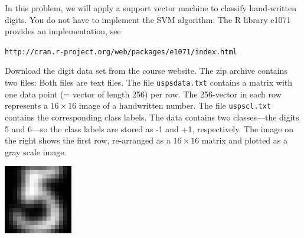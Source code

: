\documentclass[]{../util/ColumbiaAssm}
\begin{document}
\begin{questions}
%
%

In this problem, we will apply a support vector machine to classify hand-written digits. You do not have to implement the SVM algorithm: 
The R library e1071 provides an implementation, see

{\tt http://cran.r-project.org/web/packages/e1071/index.html}

\begin{minipage}{0.7\textwidth}
Download the digit data set from the course website. The zip archive contains two files: Both files are text files. The file
{\tt uspsdata.txt} contains a matrix with one data point (= vector of length 256) per row. 
The 256-vector in each row represents a $16\times 16$ 
image of a handwritten number. The file {\tt uspscl.txt} contains the corresponding class labels. 
The data contains two classes---the digits 5 and 6---so the class labels are stored as -1 and +1, respectively.
The image on the right shows the first row, re-arranged as a $16\times 16$ matrix and plotted as a gray scale image.
\end{minipage}
\begin{minipage}{0.3\textwidth}
  \begin{center}
  \includegraphics[width=3cm]{usps_digit_example.png}
  \end{center}
\end{minipage}


\end{questions}
\end{document}
